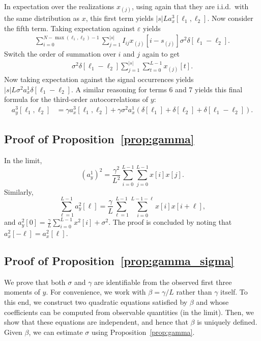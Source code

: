 \documentclass[12pt]{article}
\newcommand{\1}{\mathbf{1}}
\theoremstyle{plain}
\theoremstyle{definition}
\theoremstyle{remark}
\theoremstyle{plain}
\theoremstyle{remark}
\theoremstyle{plain}
\theoremstyle{plain}
\theoremstyle{plain}
\numberwithin{equation}{section}
\begin{document}
In expectation over the realizations $x_{(j)}$, using again that they are i.i.d.\ with the same distribution as $x$, this first term yields $|s|L a_x^3[\ell_1, \ell_2]$. Now consider the fifth term. Taking expectation against $\varepsilon$ yields
\begin{align}
\sum_{i=0}^{N-\max(\ell_1, \ell_2)-1} \sum_{j = 1}^{|s|} I_{ij} x_{(j)}[i-s_{(j)}] \sigma^2 \delta[\ell_1 - \ell_2].
\end{align}
Switch the order of summation over $i$ and $j$ again to get
\begin{align}
\sigma^2 \delta[\ell_1 - \ell_2] \sum_{j = 1}^{|s|} \sum_{t=0}^{L-1} x_{(j)}[t].
\end{align}
Now taking expectation against the signal occurrences yields $|s|L \sigma^2 a_x^1 \delta[\ell_1 - \ell_2]$. A similar reasoning for terms 6 and 7 yields this final formula for the third-order autocorrelations of $y$:
\begin{align}
a_y^3[\ell_1, \ell_2] & = \gamma a_x^3[\ell_1, \ell_2] + \gamma \sigma^2 a_x^1 \left( \delta[\ell_1] + \delta[\ell_2] + \delta[\ell_1 - \ell_2] \right).
\end{align}

\subsection{Proof of Proposition~\ref{prop:gamma}} \label{sec:proof_prop_gamma}

In the limit, 
\begin{equation*}
(a^1_y)^2=\frac{\gamma^2}{L^2}\sum_{i=0}^{L-1}\sum_{j=0}^{L-1}x[i]x[j].
\end{equation*}
Similarly,  
\begin{equation*}
\sum_{\ell = 1}^{L-1}a_y^2[\ell]=\frac{\gamma}{L}\sum_{\ell = 1}^{L-1}\sum_{i=0}^{L-1-\ell}x[i]x[i+\ell],
\end{equation*}
and $a_y^2[0]=\frac{\gamma}{L}\sum_{i=0}^{L-1}x^2[i] + \sigma^2$. The proof is concluded by noting that  $a_x^2[-\ell]=a_x^2[\ell]$. 


\subsection{Proof of Proposition~\ref{prop:gamma_sigma}} \label{sec:proof_prop_gamma_sigma}

We prove that both $\sigma$ and $\gamma$ are identifiable from the observed first three moments of $y$. For convenience, we work with $\beta = \gamma / L$ rather than $\gamma$ itself. To this end, we construct two quadratic equations satisfied by $\beta$ and whose coefficients can be computed from observable quantities (in the limit). Then, we show that these equations are independent, and hence that $\beta$ is uniquely defined. Given $\beta$, we can estimate $\sigma$ using Proposition~\ref{prop:gamma}.
\end{document}
